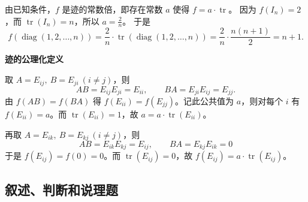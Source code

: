\documentclass[lang=cn,12pt]{elegantbook}
\begin{document}
\begin{solution}
    由已知条件，\(f\) 是迹的常数倍，即存在常数 \(a\) 使得 \(f = a\cdot\operatorname{tr}\)。
    因为 \(f(I_n)=2\)，而 \(\operatorname{tr}(I_n)=n\)，所以 \(a = \frac{2}{n}\)。
    于是
    \[
    f(\operatorname{diag}(1,2,\dots,n)) = \frac{2}{n}\cdot \operatorname{tr}(\operatorname{diag}(1,2,\dots,n))
    = \frac{2}{n}\cdot \frac{n(n+1)}{2} = n+1.
    \]

    \textbf{迹的公理化定义 }

    取 \(A = E_{ij},\ B = E_{ji}\ (i \neq j)\)，则
    \[
    AB = E_{ij}E_{ji} = E_{ii},\qquad BA = E_{ji}E_{ij} = E_{jj}.
    \]
    由 \(f(AB)=f(BA)\) 得 \(f(E_{ii}) = f(E_{jj})\)。记此公共值为 \(a\)，则对每个 \(i\) 有 \(f(E_{ii}) = a\)。而 \(\operatorname{tr}(E_{ii})=1\)，故 \(a = a \cdot \operatorname{tr}(E_{ii})\)。

    再取 \(A = E_{ik},\ B = E_{kj}\ (i \neq j)\)，则
    \[
    AB = E_{ik}E_{kj} = E_{ij},\qquad BA = E_{kj}E_{ik} = 0
    \]
    于是 \(f(E_{ij}) = f(0) = 0\)。而 \(\operatorname{tr}(E_{ij})=0\)，故 \(f(E_{ij}) = a \cdot \operatorname{tr}(E_{ij})\)。
\end{solution}
\subsection{叙述、判断和说理题}
\end{document}

